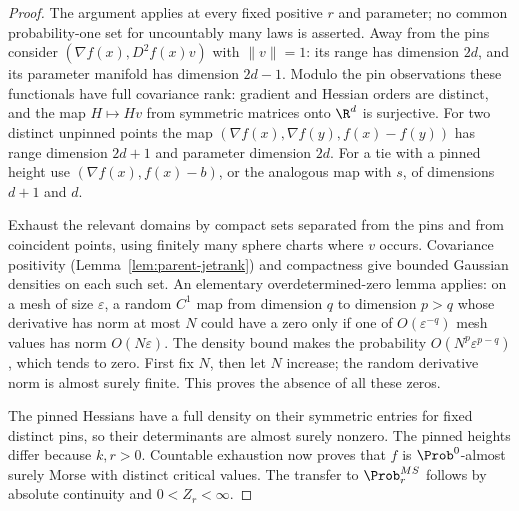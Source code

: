 \begin{proof}
The argument applies at every fixed positive $r$ and parameter; no common probability-one set for uncountably many laws is asserted. Away from the pins consider $(\nabla f(x),D^2f(x)v)$ with $\|v\|=1$: its range has dimension $2d$, and its parameter manifold has dimension $2d-1$. Modulo the pin observations these functionals have full covariance rank: gradient and Hessian orders are distinct, and the map $H\mapsto Hv$ from symmetric matrices onto $\R^d$ is surjective. For two distinct unpinned points the map $(\nabla f(x),\nabla f(y),f(x)-f(y))$ has range dimension $2d+1$ and parameter dimension $2d$. For a tie with a pinned height use $(\nabla f(x),f(x)-b)$, or the analogous map with $s$, of dimensions $d+1$ and $d$.

Exhaust the relevant domains by compact sets separated from the pins and from coincident points, using finitely many sphere charts where $v$ occurs. Covariance positivity (Lemma~\ref{lem:parent-jetrank}) and compactness give bounded Gaussian densities on each such set. An elementary overdetermined-zero lemma applies: on a mesh of size $\varepsilon$, a random $C^1$ map from dimension $q$ to dimension $p>q$ whose derivative has norm at most $N$ could have a zero only if one of $O(\varepsilon^{-q})$ mesh values has norm $O(N\varepsilon)$. The density bound makes the probability $O(N^p\varepsilon^{p-q})$, which tends to zero. First fix $N$, then let $N$ increase; the random derivative norm is almost surely finite. This proves the absence of all these zeros.

The pinned Hessians have a full density on their symmetric entries for fixed distinct pins, so their determinants are almost surely nonzero. The pinned heights differ because $k,r>0$. Countable exhaustion now proves that $f$ is $\Prob^0$-almost surely Morse with distinct critical values. The transfer to $\Prob^{MS}_r$ follows by absolute continuity and $0<Z_r<\infty$.
\end{proof}


